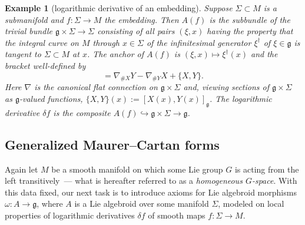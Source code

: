 \documentclass[pdftex]{sigma}%
\numberwithin{equation}{section}
\newtheorem{Example}[Theorem]{Example}
\begin{document}
\begin{Example}[logarithmic derivative of an embedding] Suppose
$\Sigma \subset M$ is a submanifold and $f \colon \Sigma \rightarrow
M$ the embedding. Then $A(f)$ is the subbundle of the trivial bundle
${\mathfrak g} \times \Sigma \rightarrow \Sigma$ consisting of all
pairs $(\xi,x)$ having the property that the integral curve on $M$
through $x \in \Sigma $ of the infinitesimal generator $\xi^\dagger$
of $\xi \in {\mathfrak g} $ is tangent to $\Sigma \subset M$ at
$x$. The anchor of $A(f)$ is $(\xi,x) \mapsto \xi^\dagger(x)$ and the
bracket well-defined by
\begin{equation*} [X,Y]=\nabla_{\#X}Y-\nabla_{\#Y}X +\{X,Y\}.
\end{equation*} Here $\nabla $ is the canonical flat connection on
${\mathfrak g} \times \Sigma$ and, viewing sections of ${\mathfrak g}
\times \Sigma $ as ${\mathfrak g} $-valued functions,
$\{X,Y\}(x):=[X(x),Y(x)]_{\mathfrak g} $. The logarithmic derivative
$\delta f$ is the composite $A(f)\hookrightarrow {\mathfrak g} \times
\Sigma \rightarrow {\mathfrak g}$.
\end{Example}

\subsection*{Generalized Maurer--Cartan forms}%

Again let $M$ be a smooth manifold on which some Lie group $G$ is
acting from the left transitively~--- what is hereafter referred to as
a {\it homogeneous $G$-space}. With this data fixed, our next task is
to introduce axioms for Lie algebroid morphisms
$\omega \colon A \rightarrow {\mathfrak g}$, where $A$ is a Lie
algebroid over some manifold $\Sigma$, modeled on local properties of
logarithmic derivatives $\delta f$ of smooth maps
$f \colon \Sigma \rightarrow M$.
\end{document}
